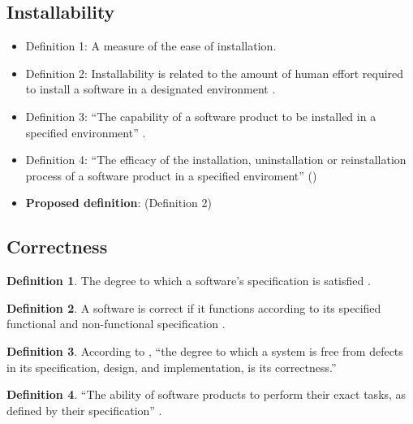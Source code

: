 \documentclass[letterpaper,cleveref]{lipics-v2019}
\theoremstyle{definition}
\newtheorem{defn}{Definition}
\begin{document}
\subsection{Installability}
\begin{itemize}
    \item{Definition 1:} A measure of the ease of installation.\\
	\item{Definition 2:} Installability is related to the amount of human effort required to install a software in a designated environment \cite{berander2005software}. \\
	\item{Definition 3:} ``The capability of a software product to be installed in a specified environment'' \cite{berander2005software}.\\
	\item{Definition 4:}  ``The efficacy of the installation, uninstallation or reinstallation process of a software product in a specified enviroment'' (\cite{iso201017043})\\
	\item {\textbf{Proposed definition}:} (Definition 2)
\end{itemize}

\subsection{Correctness}

\begin{defn}
  The degree to which a software's specification is satisfied
  \citep{berander2005software}.
\end{defn}

\begin{defn} \label{CorrectDefnSelected}
  A software is correct if it functions according to its specified functional
  and non-functional specification \cite{GhezziEtAl2003}.
\end{defn}

\begin{defn}
  According to \citet{wilson2009quality}, ``the degree to which a system is free
  from defects in its specification, design, and implementation, is its
  correctness.''
\end{defn}

\begin{defn}
  ``The ability of software products to perform their exact tasks, as defined by
  their specification'' \citep{meyer1988object}.
\end{defn}
\end{document}
